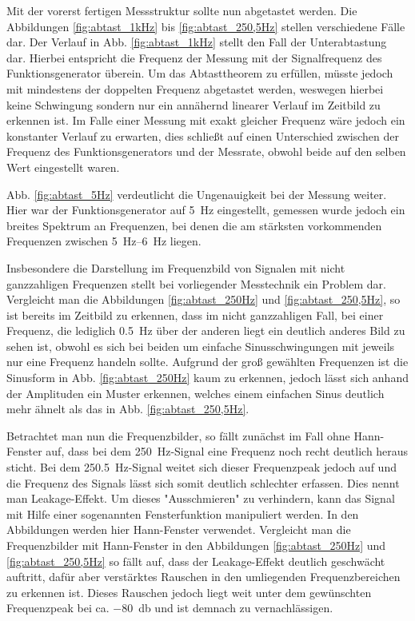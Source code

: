 		Mit der vorerst fertigen Messstruktur sollte nun abgetastet werden.
		Die Abbildungen \ref{fig:abtast_1kHz} bis \ref{fig:abtast_250,5Hz} stellen verschiedene Fälle dar.
		Der Verlauf in Abb. \ref{fig:abtast_1kHz} stellt den Fall der Unterabtastung dar.
		Hierbei entspricht die Frequenz der Messung mit der Signalfrequenz des Funktionsgenerator überein.
		Um das Abtasttheorem zu erfüllen, müsste jedoch mit mindestens der doppelten Frequenz abgetastet werden, weswegen hierbei keine Schwingung sondern nur ein annähernd linearer Verlauf im Zeitbild zu erkennen ist.
		Im Falle einer Messung mit exakt gleicher Frequenz wäre jedoch ein konstanter Verlauf zu erwarten, dies schließt auf einen Unterschied zwischen der Frequenz des Funktionsgenerators und der Messrate, obwohl beide auf den selben Wert eingestellt waren.
		
		Abb. \ref{fig:abtast_5Hz} verdeutlicht die Ungenauigkeit bei der Messung weiter.
		Hier war der Funktionsgenerator auf \SI{5}{\hertz} eingestellt, gemessen wurde jedoch ein breites Spektrum an Frequenzen, bei denen die am stärksten vorkommenden Frequenzen zwischen \SIrange{5}{6}{\hertz} liegen.
		
		Insbesondere die Darstellung im Frequenzbild von Signalen mit nicht ganzzahligen Frequenzen stellt bei vorliegender Messtechnik ein Problem dar.
		Vergleicht man die Abbildungen \ref{fig:abtast_250Hz} und \ref{fig:abtast_250,5Hz}, so ist bereits im Zeitbild zu erkennen, dass im nicht ganzzahligen Fall, bei einer Frequenz, die lediglich \SI{0,5}{\hertz} über der anderen liegt ein deutlich anderes Bild zu sehen ist, obwohl es sich bei beiden um einfache Sinusschwingungen mit jeweils nur eine Frequenz handeln sollte.
		Aufgrund der groß gewählten Frequenzen ist die Sinusform in Abb. \ref{fig:abtast_250Hz} kaum zu erkennen, jedoch lässt sich anhand der Amplituden ein Muster erkennen, welches einem einfachen Sinus deutlich mehr ähnelt als das in Abb. \ref{fig:abtast_250,5Hz}.
		
		Betrachtet man nun die Frequenzbilder, so fällt zunächst im Fall ohne Hann-Fenster auf, dass bei dem \SI{250}{\hertz}-Signal eine Frequenz noch recht deutlich heraus sticht.
		Bei dem \SI{250,5}{\hertz}-Signal weitet sich dieser Frequenzpeak jedoch auf und die Frequenz des Signals lässt sich somit deutlich schlechter erfassen.
		Dies nennt man Leakage-Effekt.
		Um dieses "Ausschmieren" zu verhindern, kann das Signal mit Hilfe einer sogenannten Fensterfunktion manipuliert werden.
		In den Abbildungen werden hier Hann-Fenster verwendet.
		Vergleicht man die Frequenzbilder mit Hann-Fenster in den Abbildungen \ref{fig:abtast_250Hz} und \ref{fig:abtast_250,5Hz} so fällt auf, dass der Leakage-Effekt deutlich geschwächt auftritt, dafür aber verstärktes Rauschen in den umliegenden Frequenzbereichen zu erkennen ist.
		Dieses Rauschen jedoch liegt weit unter dem gewünschten Frequenzpeak bei ca. \SI{-80}{\decibel} und ist demnach zu vernachlässigen.
		
